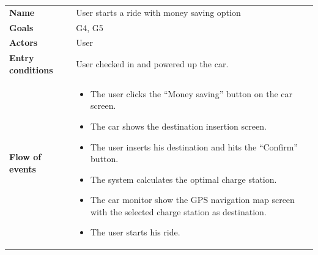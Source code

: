 \documentclass[]{article}
\providecommand{\tightlist}{%
  \setlength{\itemsep}{0pt}\setlength{\parskip}{0pt}}
\begin{document}
\begin{longtable}[]{@{}ll@{}}
\toprule
\begin{minipage}[t]{0.29\columnwidth}\raggedright\strut
\textbf{Name}\strut
\end{minipage} & \begin{minipage}[t]{0.65\columnwidth}\raggedright\strut
User starts a ride with money saving option\strut
\end{minipage}\tabularnewline
\begin{minipage}[t]{0.29\columnwidth}\raggedright\strut
\textbf{Goals}\strut
\end{minipage} & \begin{minipage}[t]{0.65\columnwidth}\raggedright\strut
G4, G5\strut
\end{minipage}\tabularnewline
\begin{minipage}[t]{0.29\columnwidth}\raggedright\strut
\textbf{Actors}\strut
\end{minipage} & \begin{minipage}[t]{0.65\columnwidth}\raggedright\strut
User\strut
\end{minipage}\tabularnewline
\begin{minipage}[t]{0.29\columnwidth}\raggedright\strut
\textbf{Entry conditions}\strut
\end{minipage} & \begin{minipage}[t]{0.65\columnwidth}\raggedright\strut
User checked in and powered up the car.\strut
\end{minipage}\tabularnewline
\begin{minipage}[t]{0.29\columnwidth}\raggedright\strut
\textbf{Flow of events}\strut
\end{minipage} & \begin{minipage}[t]{0.65\columnwidth}\raggedright\strut
\begin{itemize}
\tightlist
\item
  The user clicks the ``Money saving'' button on the car screen.
\item
  The car shows the destination insertion screen.
\item
  The user inserts his destination and hits the ``Confirm'' button.
\item
  The system calculates the optimal charge station.
\item
  The car monitor show the GPS navigation map screen with the selected
  charge station as destination.
\item
  The user starts his ride.
\end{itemize}\strut

\end{minipage}
\end{longtable}
\end{document}

